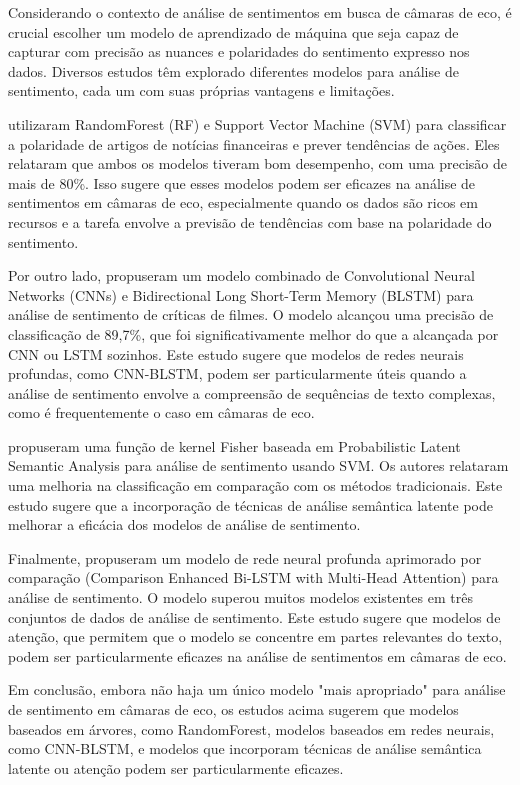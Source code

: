 Considerando o contexto de análise de sentimentos em busca de câmaras de eco, é crucial escolher um modelo de aprendizado de máquina que seja capaz de capturar com precisão as nuances e polaridades do sentimento expresso nos dados. Diversos estudos têm explorado diferentes modelos para análise de sentimento, cada um com suas próprias vantagens e limitações.

 utilizaram RandomForest (RF) e Support Vector Machine (SVM) para classificar a polaridade de artigos de notícias financeiras e prever tendências de ações. Eles relataram que ambos os modelos tiveram bom desempenho, com uma precisão de mais de 80\%. Isso sugere que esses modelos podem ser eficazes na análise de sentimentos em câmaras de eco, especialmente quando os dados são ricos em recursos e a tarefa envolve a previsão de tendências com base na polaridade do sentimento.

Por outro lado,  propuseram um modelo combinado de Convolutional Neural Networks (CNNs) e Bidirectional Long Short-Term Memory (BLSTM) para análise de sentimento de críticas de filmes. O modelo alcançou uma precisão de classificação de 89,7\%, que foi significativamente melhor do que a alcançada por CNN ou LSTM sozinhos. Este estudo sugere que modelos de redes neurais profundas, como CNN-BLSTM, podem ser particularmente úteis quando a análise de sentimento envolve a compreensão de sequências de texto complexas, como é frequentemente o caso em câmaras de eco.

 propuseram uma função de kernel Fisher baseada em Probabilistic Latent Semantic Analysis para análise de sentimento usando SVM. Os autores relataram uma melhoria na classificação em comparação com os métodos tradicionais. Este estudo sugere que a incorporação de técnicas de análise semântica latente pode melhorar a eficácia dos modelos de análise de sentimento.

Finalmente,  propuseram um modelo de rede neural profunda aprimorado por comparação (Comparison Enhanced Bi-LSTM with Multi-Head Attention) para análise de sentimento. O modelo superou muitos modelos existentes em três conjuntos de dados de análise de sentimento. Este estudo sugere que modelos de atenção, que permitem que o modelo se concentre em partes relevantes do texto, podem ser particularmente eficazes na análise de sentimentos em câmaras de eco.

Em conclusão, embora não haja um único modelo "mais apropriado" para análise de sentimento em câmaras de eco, os estudos acima sugerem que modelos baseados em árvores, como RandomForest, modelos baseados em redes neurais, como CNN-BLSTM, e modelos que incorporam técnicas de análise semântica latente ou atenção podem ser particularmente eficazes.

